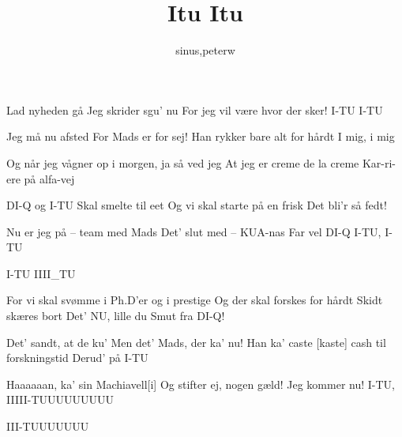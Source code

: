 \documentclass[danish]{article}
\title{Itu Itu}
\author{sinus,peterw}
\begin{document}
\maketitle

\begin{song}

Lad nyheden gå
Jeg skrider sgu' nu
For jeg vil være hvor der sker!
I-TU I-TU

Jeg må nu afsted
For Mads er for sej!
Han rykker bare alt for hårdt
I mig, i mig

Og når jeg vågner op i morgen, ja så ved jeg
At jeg er creme de la creme
Kar-ri-ere på alfa-vej

DI-Q og I-TU
Skal smelte til eet
Og vi skal starte på en frisk
Det bli'r så fedt!

Nu er jeg på -- team med Mads
Det' slut med -- KUA-nas
Far vel DI-Q
I-TU, I-TU

I-TU IIII\_TU

For vi skal svømme i Ph.D'er og i prestige
Og der skal forskes for hårdt
Skidt skæres bort
Det' NU, lille du
Smut fra DI-Q!

Det' sandt, at de ku'
Men det' Mads, der ka' nu!
Han ka' caste [kaste] cash til forskningstid
Derud' på I-TU

Haaaaaan, ka' sin Machiavell[i]
Og stifter ej, nogen gæld!
Jeg kommer nu!
I-TU, IIIII-TUUUUUUUUU

III-TUUUUUUU

\end{song}
\end{document}

